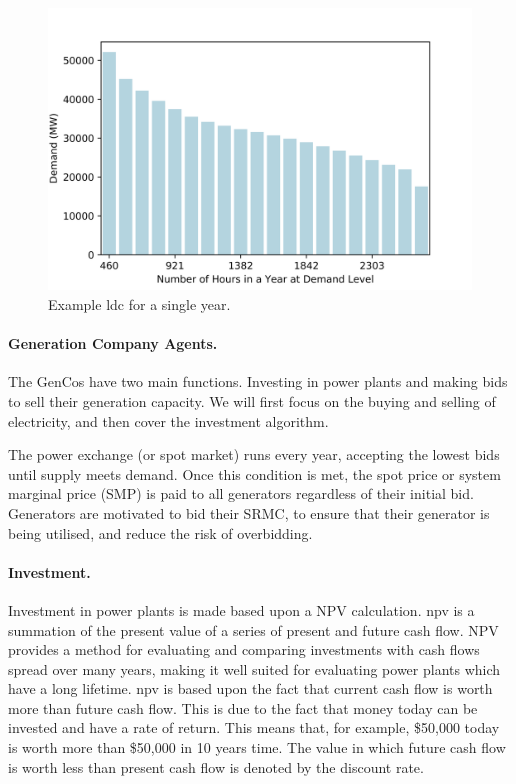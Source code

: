 \begin{figure}
	\centering
	\includegraphics[width=0.95\linewidth]{Chapter4/figures/load_duration_curve}
	\caption{Example \acrfull{ldc} for a single year.}
	\label{fig:loaddurationcurve}
\end{figure}



\paragraph{Generation Company Agents.} The GenCos have two main functions. Investing in power plants and making bids to sell their generation capacity. We will first focus on the buying and selling of electricity, and then cover the investment algorithm.

The power exchange (or spot market) runs every year, accepting the lowest bids until supply meets demand. Once this condition is met, the spot price or system marginal price (SMP) is paid to all generators regardless of their initial bid. Generators are motivated to bid their SRMC, to ensure that their generator is being utilised, and reduce the risk of overbidding.

\paragraph{Investment.} Investment in power plants is made based upon a \Gls{NPV} calculation. \acrshort{npv} is a summation of the present value of a series of present and future cash flow. NPV provides a method for evaluating and comparing investments with cash flows spread over many years, making it well suited for evaluating power plants which have a long lifetime.  \acrshort{npv} is based upon the fact that current cash flow is worth more than future cash flow. This is due to the fact that money today can be invested and have a rate of return. This means that, for example, \$50,000 today is worth more than \$50,000 in 10 years time. The value in which future cash flow is worth less than present cash flow is denoted by the discount rate.

